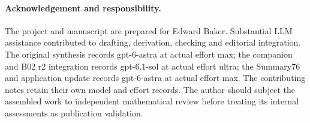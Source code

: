 \paragraph{Acknowledgement and responsibility.}
The project and manuscript are prepared for Edward Baker. Substantial
LLM assistance contributed to drafting, derivation, checking and editorial
integration. The original synthesis records gpt-6-astra at actual effort max;
the companion and B02 r2 integration records gpt-6.1-sol at actual effort ultra; the Summary76 and application update records gpt-6-astra at actual effort max.
The contributing notes retain their own model and effort records.
The author should subject the assembled work to independent mathematical
review before treating its internal assessments as publication validation.
